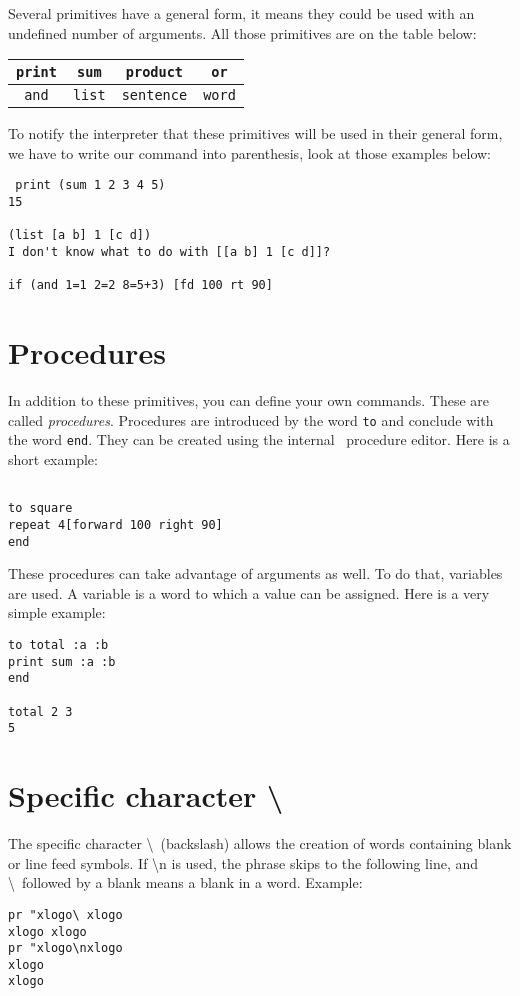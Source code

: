 Several primitives have a general form, it means they could be used with an undefined number of arguments. All those primitives are on the table below:
\begin{center}
 \begin{tabular}{cccc}
 \texttt{print} & \texttt{sum}&\texttt{product} &\texttt{or}\\
\hline
\texttt{and}&\texttt{list}&\texttt{sentence}& \texttt{word}\\
 \end{tabular} 
\end{center}
To notify the interpreter that these primitives will be used in their general form, we have to write our command into parenthesis, look at those examples below: \pagebreak
 \begin{verbatim}
 print (sum 1 2 3 4 5)
15

(list [a b] 1 [c d])
I don't know what to do with [[a b] 1 [c d]]?

if (and 1=1 2=2 8=5+3) [fd 100 rt 90]
\end{verbatim}

\section{Procedures}

In addition to these primitives, you can define your own commands.
These are called \textit{procedures}. Procedures are introduced by
the word \texttt{to} and conclude with the word \texttt{end}. They
can be created using the internal \xlogo\ procedure editor. Here is
a short example: \begin{verbatim}

to square
repeat 4[forward 100 right 90]
end

\end{verbatim}

These procedures can take advantage of arguments as well. To do that,
variables are used. A variable is a word to which a value can be assigned.
Here is a very simple example:
\begin{verbatim}
to total :a :b
print sum :a :b
end

total 2 3
5
\end{verbatim} 
\section{Specific character \textbackslash}
The specific character \textbackslash \ (backslash) allows the creation of words containing blank or line feed symbols. If \textbackslash n is used, the phrase skips to the following line, and \textbackslash\textvisiblespace\ followed by a blank means a blank in a word.
Example:
\begin{verbatim}
pr "xlogo\ xlogo
xlogo xlogo
pr "xlogo\nxlogo
xlogo
xlogo
\end{verbatim}

